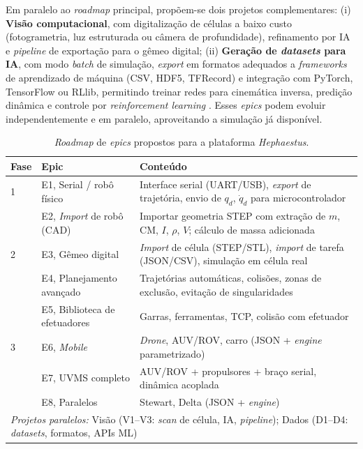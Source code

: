 Em paralelo ao \textit{roadmap} principal, propõem-se dois projetos complementares: (i) \textbf{Visão computacional}, com digitalização de células a baixo custo (fotogrametria, luz estruturada ou câmera de profundidade), refinamento por IA e \textit{pipeline} de exportação para o gêmeo digital; (ii) \textbf{Geração de \textit{datasets} para IA}, com modo \textit{batch} de simulação, \textit{export} em formatos adequados a \textit{frameworks} de aprendizado de máquina (CSV, HDF5, TFRecord) e integração com PyTorch, TensorFlow ou RLlib, permitindo treinar redes para cinemática inversa, predição dinâmica e controle por \textit{reinforcement learning} \cite{corke2021toolbox}. Esses \textit{epics} podem evoluir independentemente e em paralelo, aproveitando a simulação já disponível.

\begin{table}[h!]
\centering
\caption{\textit{Roadmap} de \textit{epics} propostos para a plataforma \textit{Hephaestus}.}
\label{tab:epics}
\small
\setlength{\tabcolsep}{4pt}
\begin{tabular}{p{1.0cm} p{2.8cm} p{9.6cm}}
\hline
\textbf{Fase} & \textbf{Epic} & \textbf{Conteúdo} \\
\hline
1 & E1, Serial / robô físico & Interface serial (UART/USB), \textit{export} de trajetória, envio de $q_d$, $\dot{q}_d$ para microcontrolador \\
& E2, \textit{Import} de robô (CAD) & Importar geometria STEP com extração de $m$, CM, $I$, $\rho$, $V$; cálculo de massa adicionada \\
\hline
2 & E3, Gêmeo digital & \textit{Import} de célula (STEP/STL), \textit{import} de tarefa (JSON/CSV), simulação em célula real \\
& E4, Planejamento avançado & Trajetórias automáticas, colisões, zonas de exclusão, evitação de singularidades \\
& E5, Biblioteca de efetuadores & Garras, ferramentas, TCP, colisão com efetuador \\
\hline
3 & E6, \textit{Mobile} & \textit{Drone}, AUV/ROV, carro (JSON + \textit{engine} parametrizado) \\
& E7, UVMS completo & AUV/ROV + propulsores + braço serial, dinâmica acoplada \\
& E8, Paralelos & Stewart, Delta (JSON + \textit{engine}) \\
\hline
\multicolumn{3}{p{13.4cm}}{\textit{Projetos paralelos:} Visão (V1--V3: \textit{scan} de célula, IA, \textit{pipeline}); Dados (D1--D4: \textit{datasets}, formatos, APIs ML)} \\
\hline
\end{tabular}
\end{table}


